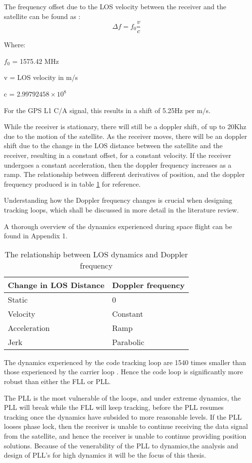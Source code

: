 The frequency offset due to the \ac{LOS} velocity between the receiver and the satellite can be found as : 
$$\Delta f = f_0\frac{v}{c}$$

Where: 

$f_0$ = 1575.42 MHz   

v = \ac{LOS} velocity in m/s

c = $2.99792458 \times 10^8$

For the GPS L1 C/A signal, this results in a shift of 5.25Hz per m/s. 

While the receiver is stationary, there will still be a doppler shift, of up to 20Khz due to the motion of the satellite\cite{Kaplan}. As the receiver moves, there will be an doppler shift due to the change in the \ac{LOS} distance between the satellite and the receiver, resulting in a constant offset, for a constant velocity. If the receiver undergoes a constant acceleration, then the doppler frequency increases as a ramp. The relationship between different derivatives of position, and the doppler frequency produced is in table \ref{table:DopplerDynamics} for reference.

Understanding how the Doppler frequency changes is crucial when designing tracking loops, which shall be discussed in more detail in the literature review. 


A thorough overview of the dynamics experienced during space flight can be found in Appendix 1.

\begin{table}[h]
\centering
\begin{tabular}{|l|l|}
\hline
Change in LOS Distance & Doppler frequency \\ \hline
Static                 & 0                 \\ \hline
Velocity               & Constant          \\ \hline
Acceleration           & Ramp              \\ \hline
Jerk                   & Parabolic         \\ \hline
\end{tabular}
\caption{The relationship between \ac{LOS} dynamics and Doppler frequency}
\label{table:DopplerDynamics}
\end{table}

The dynamics experienced by the code tracking loop are 1540 times smaller than those experienced by the carrier loop \cite{Kaplan}. Hence the  code loop is significantly more robust than either the \ac{FLL} or \ac{PLL}.

The \ac{PLL} is the most vulnerable of the loops, and under extreme dynamics, the \ac{PLL} will break while the \ac{FLL} will keep tracking, before the \ac{PLL} resumes tracking once the dynamics have subsided to more reasonable levels. If the \ac{PLL} looses phase lock, then the receiver is unable to continue receiving the data signal from the satellite, and hence the receiver is unable to continue providing position solutions. Because of the venerability of the \ac{PLL} to dynamics,the analysis and design of \ac{PLL}'s for high dynamics it will be the focus of this thesis. 

